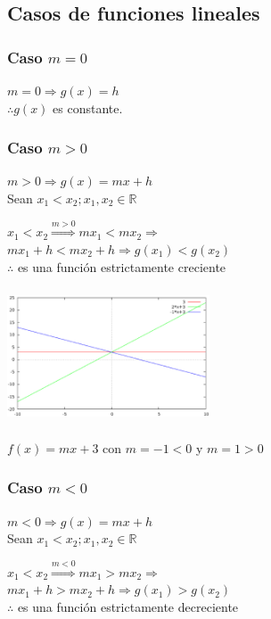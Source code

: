 \subsection{Casos de funciones lineales}
\subsubsection{Caso $m=0$}
\begin{center}
$m=0 \Rightarrow g(x)=h$\\$ \therefore g(x)$ es constante.
\end{center}
\subsubsection{Caso $m>0$}
\hfill
\begin{minipage}{.45\textwidth}
$m>0 \Rightarrow g(x)= mx+h$\\

Sean  $x_{1} < x_{2}; x_{1}, x_{2} \in \mathbb{R}$
\begin{center}
$x_{1} < x_{2} \stackrel{m > 0}{\Rightarrow} mx_{1}  < mx_{2} \Rightarrow$\\
 $mx_{1}+h < mx_{2}+h \Rightarrow g(x_{1}) < g(x_{2})$\\
 $\therefore$ es una función estrictamente creciente  
\end{center}
\end{minipage}
\hfill
\begin{minipage}{.45\textwidth}
\includegraphics[height=4cm,width=6cm]{flinealcasos.eps} 
\begin{center}
$f(x)=mx+3$ con $m=-1< 0$ y $m=1>0$
\end{center} 
\end{minipage}
\hfill
\subsubsection{Caso $m<0$}
$m<0 \Rightarrow g(x)= mx+h$\\

Sean  $x_{1} < x_{2}; x_{1}, x_{2} \in \mathbb{R}$
\begin{center}
$x_{1} < x_{2} \stackrel{m < 0}{\Rightarrow} mx_{1}  > mx_{2} \Rightarrow$\\
 $mx_{1}+h > mx_{2}+h \Rightarrow g(x_{1}) > g(x_{2})$\\
 $\therefore$ es una función estrictamente decreciente  
\end{center}

